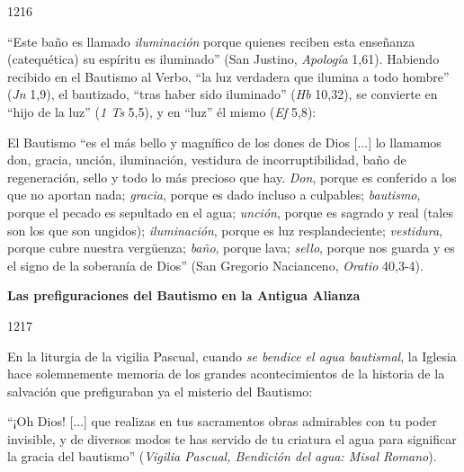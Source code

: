 			\begin{ccebody}\begin{ccenumber}1216\end{ccenumber} “Este baño es llamado \textit{iluminación} porque quienes reciben esta enseñanza (catequética) su espíritu es iluminado” (San Justino, \textit{Apología} 1,61). Habiendo recibido en el Bautismo al Verbo, “la luz verdadera que ilumina a todo hombre” (\textit{Jn} 1,9), el bautizado, “tras haber sido iluminado” (\textit{Hb} 10,32), se convierte en “hijo de la luz” (\textit{1 Ts} 5,5), y en “luz” él mismo (\textit{Ef }5,8):\end{ccebody}
			
			\begin{ccecite}El Bautismo “es el más bello y magnífico de los dones de Dios [...] lo llamamos don, gracia, unción, iluminación, vestidura de incorruptibilidad, baño de regeneración, sello y todo lo más precioso que hay. \textit{Don}, porque es conferido a los que no aportan nada; \textit{gracia}, porque es dado incluso a culpables; \textit{bautismo}, porque el pecado es sepultado en el agua; \textit{unción}, porque es sagrado y real (tales son los que son ungidos); \textit{iluminación}, porque es luz resplandeciente; \textit{vestidura}, porque cubre nuestra vergüenza; \textit{baño}, porque lava; \textit{sello}, porque nos guarda y es el signo de la soberanía de Dios” (San Gregorio Nacianceno, \textit{Oratio} 40,3-4).\end{ccecite}
			
			\begin{ccebody}\textbf{Las prefiguraciones del Bautismo en la Antigua Alianza}\end{ccebody}
			
			\begin{ccebody}\begin{ccenumber}1217\end{ccenumber} En la liturgia de la vigilia Pascual, cuando \textit{se bendice el agua bautismal}, la Iglesia hace solemnemente memoria de los grandes acontecimientos de la historia de la salvación que prefiguraban ya el misterio del Bautismo:\end{ccebody}
			
			\begin{ccecite}“¡Oh Dios! [...] que realizas en tus sacramentos obras admirables con tu poder invisible, y de diversos modos te has servido de tu criatura el agua para significar la gracia del bautismo” (\textit{Vigilia Pascual, Bendición del agua: Misal Romano}).\end{ccecite}
			
